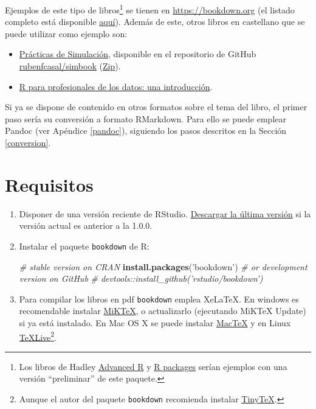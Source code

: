 \documentclass[]{book}
\newenvironment{Shaded}{\begin{snugshade}}{\end{snugshade}}
\newcommand{\KeywordTok}[1]{\textcolor[rgb]{0.13,0.29,0.53}{\textbf{#1}}}
\newcommand{\StringTok}[1]{\textcolor[rgb]{0.31,0.60,0.02}{#1}}
\newcommand{\CommentTok}[1]{\textcolor[rgb]{0.56,0.35,0.01}{\textit{#1}}}
\newcommand{\NormalTok}[1]{#1}
\let\rmarkdownfootnote\footnote%
\def\footnote{\protect\rmarkdownfootnote}
\theoremstyle{definition}
\theoremstyle{definition}
\theoremstyle{definition}
\theoremstyle{remark}
\begin{document}
Ejemplos de este tipo de libros\footnote{Los libros de Hadley
  \href{http://adv-r.had.co.nz}{Advanced R} y
  \href{http://r-pkgs.had.co.nz}{R packages} serían ejemplos con una
  versión ``preliminar'' de este paquete.} se tienen en
\url{https://bookdown.org} (el listado completo está disponible
\href{https://bookdown.org/home/archive/}{aquí}). Además de este, otros
libros en castellano que se puede utilizar como ejemplo son:

\begin{itemize}
\item
  \href{https://rubenfcasal.github.io/simbook}{Prácticas de Simulación},
  disponible en el repositorio de GitHub
  \href{https://github.com/rubenfcasal/simbook}{rubenfcasal/simbook}
  (\href{https://github.com/rubenfcasal/simbook/archive/master.zip}{Zip}).
\item
  \href{https://www.datanalytics.com/libro_r/index.html}{R para
  profesionales de los datos: una introducción}.
\end{itemize}

Si ya se dispone de contenido en otros formatos sobre el tema del libro,
el primer paso sería su conversión a formato RMarkdown. Para ello se
puede emplear Pandoc (ver Apéndice \ref{pandoc}), siguiendo los pasos
descritos en la Sección \ref{conversion}.

\section{Requisitos}\label{requisitos}

\begin{enumerate}
\def\labelenumi{\arabic{enumi}.}
\item
  Disponer de una versión reciente de RStudio.
  \href{https://www.rstudio.com/products/rstudio/download/}{Descargar la
  última versión} si la versión actual es anterior a la 1.0.0.
\item
  Instalar el paquete \texttt{bookdown} de R:

\begin{Shaded}
\begin{Highlighting}[]
\CommentTok{# stable version on CRAN}
\KeywordTok{install.packages}\NormalTok{(}\StringTok{'bookdown'}\NormalTok{)}
\CommentTok{# or development version on GitHub}
\CommentTok{# devtools::install_github('rstudio/bookdown')}
\end{Highlighting}
\end{Shaded}
\item
  Para compilar los libros en pdf \texttt{bookdown} emplea XeLaTeX. En
  windows es recomendable instalar
  \href{https://miktex.org/download}{MiKTeX}, o actualizarlo (ejecutando
  MiKTeX Update) si ya está instalado. En Mac OS X se puede instalar
  \href{http://www.tug.org/mactex/}{MacTeX} y en Linux
  \href{http://www.tug.org/texlive}{TeXLive}\footnote{Aunque el autor
    del paquete \texttt{bookdown} recomienda instalar
    \href{https://yihui.name/tinytex}{TinyTeX}.}.
\end{enumerate}
\end{document}
